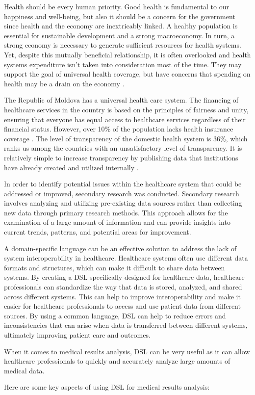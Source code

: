 Health should be every human priority. Good health is fundamental to our happiness and well-being, but also it should be a concern for the government since health and the economy are inextricably linked.
A healthy population is essential for sustainable development and a strong macroeconomy. In turn, a strong economy is necessary to generate sufficient resources for health systems. Yet, despite this mutually beneficial relationship, it is often overlooked and health systems expenditure isn’t taken into consideration most of the time. They may support the goal of universal health coverage, but have concerns that spending on health may be a drain on the economy \cite{health}.

The Republic of Moldova has a universal health care system. The financing of healthcare services in the country is based on the principles of fairness and unity, ensuring that everyone has equal access to healthcare services regardless of their financial status. However, over 10\% of the population lacks health insurance coverage \cite{country}. 
The level of transparency of the domestic health system is 36\%, which ranks us among the countries with an unsatisfactory level of transparency.  It is relatively simple to increase transparency by publishing data that institutions have already created and utilized internally \cite{carp}. \par
In order to identify potential issues within the healthcare system that could be addressed or improved, secondary research was conducted. Secondary research involves analyzing and utilizing pre-existing data sources rather than collecting new data through primary research methods. This approach allows for the examination of a large amount of information and can provide insights into current trends, patterns, and potential areas for improvement.

A domain-specific language can be an effective solution to address the lack of system interoperability in healthcare. Healthcare systems often use different data formats and structures, which can make it difficult to share data between systems. By creating a DSL specifically designed for healthcare data, healthcare professionals can standardize the way that data is stored, analyzed, and shared across different systems. This can help to improve interoperability and make it easier for healthcare professionals to access and use patient data from different sources. By using a common language, DSL can help to reduce errors and inconsistencies that can arise when data is transferred between different systems, ultimately improving patient care and outcomes. \par
When it comes to medical results analysis, DSL can be very useful as it can allow healthcare professionals to quickly and accurately analyze large amounts of medical data. \par
Here are some key aspects of using DSL for medical results analysis:


